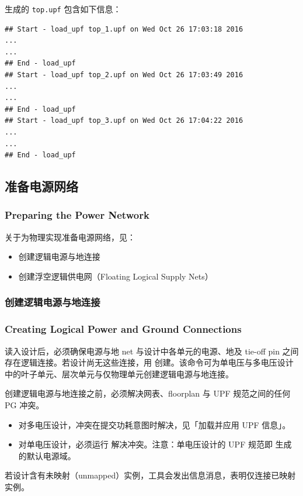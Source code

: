 生成的 \texttt{top.upf} 包含如下信息：
\begin{lstlisting}
## Start - load_upf top_1.upf on Wed Oct 26 17:03:18 2016
...
...
## End - load_upf
## Start - load_upf top_2.upf on Wed Oct 26 17:03:49 2016
...
...
## End - load_upf
## Start - load_upf top_3.upf on Wed Oct 26 17:04:22 2016
...
...
## End - load_upf
\end{lstlisting}

\subsection{准备电源网络}
\subsubsection*{Preparing the Power Network}

关于为物理实现准备电源网络，见：
\begin{itemize}
  \item 创建逻辑电源与地连接
  \item 创建浮空逻辑供电网（Floating Logical Supply Nets）
\end{itemize}

\subsubsection{创建逻辑电源与地连接}
\subsubsection*{Creating Logical Power and Ground Connections}

读入设计后，必须确保电源与地 net 与设计中各单元的电源、地及 tie-off pin 之间存在逻辑连接。若设计尚无这些连接，用  创建。该命令可为单电压与多电压设计中的叶子单元、层次单元与仅物理单元创建逻辑电源与地连接。

创建逻辑电源与地连接之前，必须解决网表、floorplan 与 UPF 规范之间的任何 PG 冲突。
\begin{itemize}
  \item 对多电压设计，冲突在提交功耗意图时解决，见「加载并应用 UPF 信息」。
  \item 对单电压设计，必须运行  解决冲突。注意：单电压设计的 UPF 规范即  生成的默认电源域。
\end{itemize}

若设计含有未映射（unmapped）实例，工具会发出信息消息，表明仅连接已映射实例。


